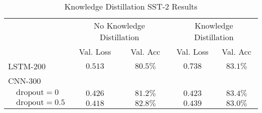\begin{table*}[!htb]
        \caption{Knowledge Distillation SST-2 Results}
        \label{tab:kd_results}
        \centering
        \vspace{1em}
        \begin{tabular}{p{.1em}lcccc}
\toprule
& & \multicolumn{2}{c}{No Knowledge Distillation} & \multicolumn{2}{c}{Knowledge Distillation}
\\
\cmidrule(lr){3-4} \cmidrule(lr){5-6}
& & Val. Loss & Val. Acc & Val. Loss & Val. Acc \\
\cmidrule{3-6}
\multicolumn{2}{l}{LSTM-200} & $0.513$ & $80.5\%$ & $0.738$ & $83.1\%$ \\
[\tableblocksep]
\multicolumn{2}{l}{CNN-300} \citep{kim2014convolutional}  \\
& $\text{dropout}=0$ & $0.426$ & $81.2\%$ & $0.423$ & $83.4\%$ \\
& $\text{dropout}=0.5$ & $0.418$ & $82.8\%$ & $0.439$ & $83.0\%$ \\
\bottomrule
\end{tabular}

\end{table*}
